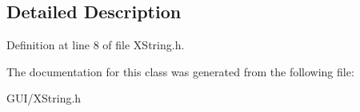 \subsection{Detailed Description}


Definition at line 8 of file X\+String.\+h.



The documentation for this class was generated from the following file\+:\begin{DoxyCompactItemize}
\item 
G\+U\+I/X\+String.\+h\end{DoxyCompactItemize}

